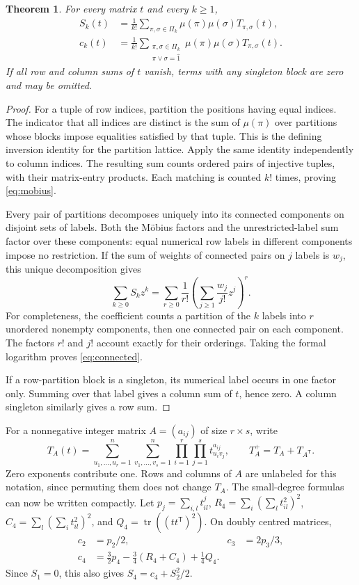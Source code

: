 \documentclass[11pt]{article}
\DeclareMathOperator{\tr}{tr}
\newtheorem{theorem}{Theorem}[section]
\theoremstyle{definition}
\theoremstyle{remark}
\begin{document}
\begin{theorem}\label{thm:connected}
For every matrix $t$ and every $k\geq1$,
\begin{align}
 S_k(t)&=\frac1{k!}\sum_{\pi,\sigma\in\Pi_k}
 \mu(\pi)\mu(\sigma)T_{\pi,\sigma}(t),\label{eq:mobius}\\
 c_k(t)&=\frac1{k!}\sum_{\substack{\pi,\sigma\in\Pi_k\\\pi\vee\sigma=\hat1}}
 \mu(\pi)\mu(\sigma)T_{\pi,\sigma}(t).\label{eq:connected}
\end{align}
If all row and column sums of $t$ vanish, terms with any singleton block are zero and may be omitted.
\end{theorem}
\begin{proof}
For a tuple of row indices, partition the positions having equal indices. The indicator that all indices are distinct is the sum of $\mu(\pi)$ over partitions whose blocks impose equalities satisfied by that tuple. This is the defining inversion identity for the partition lattice. Apply the same identity independently to column indices. The resulting sum counts ordered pairs of injective tuples, with their matrix-entry products. Each matching is counted $k!$ times, proving \eqref{eq:mobius}.

Every pair of partitions decomposes uniquely into its connected components on disjoint sets of labels. Both the M\"obius factors and the unrestricted-label sum factor over these components: equal numerical row labels in different components impose no restriction. If the sum of weights of connected pairs on $j$ labels is $w_j$, this unique decomposition gives
\[
 \sum_{k\geq0}S_kz^k
 =\sum_{r\geq0}\frac1{r!}\left(\sum_{j\geq1}\frac{w_j}{j!}z^j\right)^r.
\]
For completeness, the coefficient counts a partition of the $k$ labels into $r$ unordered nonempty components, then one connected pair on each component. The factors $r!$ and $j!$ account exactly for their orderings. Taking the formal logarithm proves \eqref{eq:connected}.

If a row-partition block is a singleton, its numerical label occurs in one factor only. Summing over that label gives a column sum of $t$, hence zero. A column singleton similarly gives a row sum.
\end{proof}

For a nonnegative integer matrix $A=(a_{ij})$ of size $r\times s$, write
\[
 T_A(t)=\sum_{u_1,\ldots,u_r=1}^n\sum_{v_1,\ldots,v_s=1}^n
           \prod_{i=1}^r\prod_{j=1}^s t_{u_i v_j}^{a_{ij}},
 \qquad T_A^+=T_A+T_{A^{\mathsf T}}.
\]
Zero exponents contribute one. Rows and columns of $A$ are unlabeled for this notation, since permuting them does not change $T_A$.
The small-degree formulas can now be written compactly.
Let $p_j=\sum_{i,l}t_{il}^j$, $R_4=\sum_i(\sum_l t_{il}^2)^2$, $C_4=\sum_l(\sum_i t_{il}^2)^2$, and $Q_4=\tr((tt^{\mathsf T})^2)$.
On doubly centred matrices,
\begin{align*}
 c_2&=p_2/2,&c_3&=2p_3/3,\\
 c_4&=\tfrac32p_4-\tfrac34(R_4+C_4)+\tfrac14Q_4.
\end{align*}
Since $S_1=0$, this also gives
$S_4=c_4+S_2^2/2$.
\end{document}
